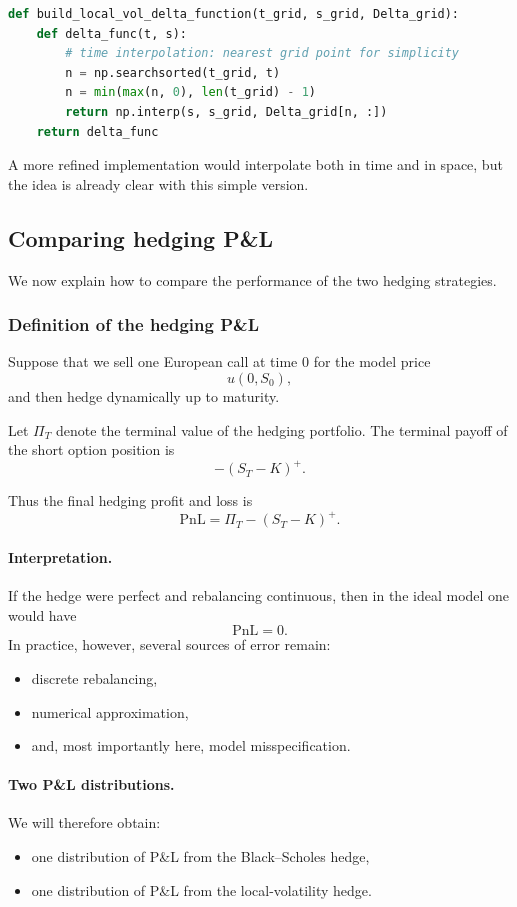 \documentclass[11pt]{article}
\theoremstyle{plain}
\theoremstyle{definition}
\theoremstyle{remark}
\begin{document}
\begin{lstlisting}[language=Python]
def build_local_vol_delta_function(t_grid, s_grid, Delta_grid):
    def delta_func(t, s):
        # time interpolation: nearest grid point for simplicity
        n = np.searchsorted(t_grid, t)
        n = min(max(n, 0), len(t_grid) - 1)
        return np.interp(s, s_grid, Delta_grid[n, :])
    return delta_func
\end{lstlisting}

A more refined implementation would interpolate both in time and in
space, but the idea is already clear with this simple version.

\subsection{Comparing hedging P\&L}

We now explain how to compare the performance of the two hedging
strategies.

\subsubsection{Definition of the hedging P\&L}

Suppose that we sell one European call at time \(0\) for the model price
\[
u(0,S_0),
\]
and then hedge dynamically up to maturity.

Let \(\Pi_T\) denote the terminal value of the hedging portfolio.
The terminal payoff of the short option position is
\[
-(S_T-K)^+.
\]

Thus the final hedging profit and loss is
\[
\boxed{
\mathrm{PnL}
=
\Pi_T-(S_T-K)^+.
}
\]

\paragraph{Interpretation.}
If the hedge were perfect and rebalancing continuous, then in the ideal
model one would have
\[
\mathrm{PnL}=0.
\]
In practice, however, several sources of error remain:
\begin{itemize}[leftmargin=1.4em]
    \item discrete rebalancing,
    \item numerical approximation,
    \item and, most importantly here, model misspecification.
\end{itemize}

\paragraph{Two P\&L distributions.}
We will therefore obtain:
\begin{itemize}[leftmargin=1.4em]
    \item one distribution of P\&L from the Black--Scholes hedge,
    \item one distribution of P\&L from the local-volatility hedge.
\end{itemize}
\end{document}
